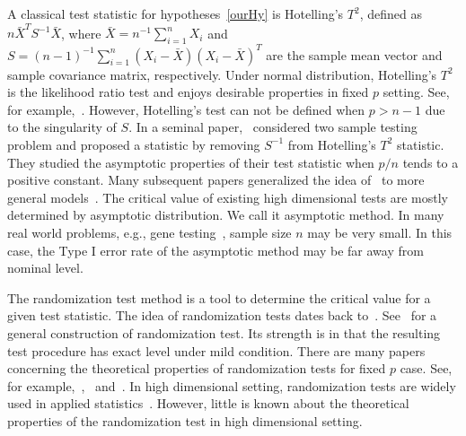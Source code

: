 \documentclass[review]{elsarticle}
\newcommand{\BP}{\mathbf{P}}
\theoremstyle{plain}
\theoremstyle{definition}
\theoremstyle{remark}
\begin{document}
A classical test statistic for hypotheses~\eqref{ourHy} is Hotelling's $T^2$, defined as
    $
    n\bar{X}^T S^{-1}\bar{X}
    $,
where $\bar{X}=n^{-1}\sum_{i=1}^n X_i$ and $S=(n-1)^{-1}\sum_{i=1}^n (X_i-\bar{X}) (X_i-\bar{X})^T$ are the sample mean vector and sample covariance matrix, respectively.
Under normal distribution, Hotelling's $T^2$ is the likelihood ratio test and enjoys desirable properties in fixed $p$ setting. See, for example,~\citet{andersonMultivariate}.
However, Hotelling's test can not be defined when $p>n-1$ due to the singularity of $S$.
In a seminal paper,~\citet{Bai1996Efiect} considered two sample testing problem and proposed a statistic by removing $S^{-1}$ from Hotelling's $T^2$ statistic.
They studied the asymptotic properties of their test statistic when $p/n$ tends to a positive constant.
Many subsequent papers generalized the idea of~\citet{Bai1996Efiect} to more general models~\citep{Srivastava2008A,Chen2010A,Wang2015A}.
The critical value of existing high dimensional tests are mostly determined by asymptotic distribution. 
We call it asymptotic method.
 In many real world problems, e.g., gene testing~\citep{efron2007on}, sample size $n$ may be very small.
In this case, the Type I error rate of the asymptotic method may be far away from nominal level. 

The randomization test method is a tool to determine the critical value for a given test statistic.
The idea of randomization tests dates back to~\citet{Fisher}.
See~\citet{Romano1990On} for a general construction of randomization test.
Its strength is in that the resulting test procedure has exact level under mild condition.
There are many papers concerning the theoretical properties of randomization tests for fixed $p$ case.
See, for example,~\citet{Romano1990On},~\citet{Zhu2000N} and~\citet{Chung2016Multivariate}.
In high dimensional setting, randomization tests are widely used in applied statistics~\citep{Subramanian2005,efron2007on,Ko2016}.
However, little is known about the theoretical properties of the randomization test in high dimensional setting.
\end{document}
